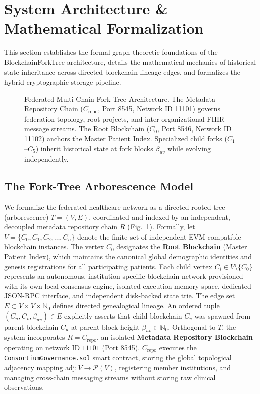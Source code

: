 \section{System Architecture \& Mathematical Formalization}
\label{sec:system_architecture}

This section establishes the formal graph-theoretic foundations of the BlockchainForkTree architecture, details the mathematical mechanics of historical state inheritance across directed blockchain lineage edges, and formalizes the hybrid cryptographic storage pipeline.

\begin{figure}[t]
\centering
\resizebox{\linewidth}{!}{}

\caption{Federated Multi-Chain Fork-Tree Architecture. The Metadata Repository Chain ($C_{\text{repo}}$, Port 8545, Network ID 11101) governs federation topology, root projects, and inter-organizational FHIR message streams. The Root Blockchain ($C_0$, Port 8546, Network ID 11102) anchors the Master Patient Index. Specialized child forks ($C_1$--$C_5$) inherit historical state at fork blocks $\beta_{uv}$ while evolving independently.}
\label{fig:topology}
\end{figure}

\subsection{The Fork-Tree Arborescence Model}
We formalize the federated healthcare network as a directed rooted tree (arborescence) $T = (V, E)$, coordinated and indexed by an independent, decoupled metadata repository chain $R$ (Fig.~\ref{fig:topology}). Formally, let $V = \{C_0, C_1, C_2, \dots, C_n\}$ denote the finite set of independent EVM-compatible blockchain instances. The vertex $C_0$ designates the \textbf{Root Blockchain} (Master Patient Index), which maintains the canonical global demographic identities and genesis registrations for all participating patients. Each child vertex $C_i \in V \setminus \{C_0\}$ represents an autonomous, institution-specific blockchain network provisioned with its own local consensus engine, isolated execution memory space, dedicated JSON-RPC interface, and independent disk-backed state trie. The edge set $E \subset V \times V \times \mathbb{N}_0$ defines directed genealogical lineage. An ordered tuple $(C_u, C_v, \beta_{uv}) \in E$ explicitly asserts that child blockchain $C_v$ was spawned from parent blockchain $C_u$ at parent block height $\beta_{uv} \in \mathbb{N}_0$. Orthogonal to $T$, the system incorporates $R = C_{\text{repo}}$, an isolated \textbf{Metadata Repository Blockchain} operating on network ID $11101$ (Port 8545). $C_{\text{repo}}$ executes the \texttt{ConsortiumGovernance.sol} smart contract, storing the global topological adjacency mapping $\text{adj}: V \to \mathcal{P}(V)$, registering member institutions, and managing cross-chain messaging streams without storing raw clinical observations.

